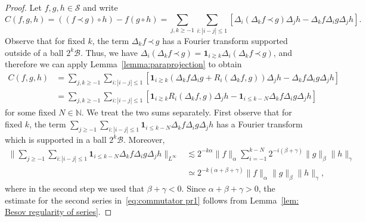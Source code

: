 \documentclass[a4paper,11pt]{article}
\theoremstyle{remark}
\newcommand{\CB}{\ensuremath{\mathscr{B}}}
\newcommand{\CS}{\ensuremath{\mathscr{S}}}
\newcommand{\lpara}{\,\mathord{\prec}\,}
\newcommand{\reso}{\,\mathord{\circ}\,}
\begin{document}
\begin{proof}
  Let $f,g,h \in \CS$ and write
  \[
     C ( f,g,h ) = ( ( f \lpara g ) \reso h ) -f ( g \reso h ) = \sum_{j,k  \geqslant -1} \sum_{i: | i-j | \leqslant 1} [ \Delta_{i} ( \Delta_{k} f  \lpara g ) \Delta_{j} h- \Delta_{k} f \Delta_{i} g \Delta_{j} h ].
  \]
  Observe that for fixed $k$, the term $\Delta_{k} f \lpara g$ has a Fourier transform supported outside of a ball $2^{k} \CB$. Thus, we have $\Delta_{i}( \Delta_{k} f \lpara g ) = \mathbf{1}_{i \gtrsim k} \Delta_{i} ( \Delta_{k}f \lpara g )$, and therefore we can apply Lemma~\ref{lemma:paraprojection} to obtain
  \begin{align}\label{eq:commutator pr1}\nonumber
     C ( f,g,h ) &= \sum_{j,k \geqslant -1} \sum_{i: | i-j | \leqslant 1} [\mathbf{1}_{i \gtrsim k} ( \Delta_{k} f \Delta_{i} g+R_{i} ( \Delta_{k} f,g ) ) \Delta_{j} h- \Delta_{k} f \Delta_{i} g \Delta_{j} h] \\
    &= \sum_{j,k \geqslant -1} \sum_{i: | i-j | \leqslant 1} [\mathbf{1}_{i \gtrsim k} R_{i} ( \Delta_{k} f,g ) \Delta_{j} h -  \mathbf{1}_{i \leqslant k-N} \Delta_{k} f \Delta_{i} g \Delta_{j} h]
  \end{align}
  for some fixed $N \in \mathbb{N}$. We treat the two sums separately. First
  observe that for fixed $k$, the term $\sum_{j \geqslant -1} \sum_{i: | i-j | \leqslant 1} \mathbf{1}_{i \leqslant k-N} \Delta_{k} f \Delta_{i} g \Delta_{j} h$ has a
  Fourier transform which is supported in a ball $2^{k} \CB$.
  Moreover,
  \begin{align*}
     \Bigg\| \sum_{j \geqslant -1} \sum_{i: | i-j | \leqslant 1} \mathbf{1}_{i \leqslant k-N} \Delta_{k} f \Delta_{i} g \Delta_{j} h \Bigg\|_{L^{\infty}} & \lesssim 2^{-k \alpha} \| f \|_{\alpha} \sum_{i=-1}^{k-N} 2^{-i ( \beta + \gamma)} \| g \|_{\beta} \| h \|_{\gamma} \\
     & \simeq 2^{-k ( \alpha + \beta + \gamma )} \| f \|_{\alpha} \| g \|_{\beta} \| h \|_{\gamma},
  \end{align*}
  where in the second step we used that $\beta + \gamma <0$. Since $\alpha +  \beta + \gamma >0$, the estimate for the second series
  in~{\eqref{eq:commutator pr1}} follows from Lemma~\ref{lem: Besov regularity of series}.
  

\end{proof}
\end{document}
